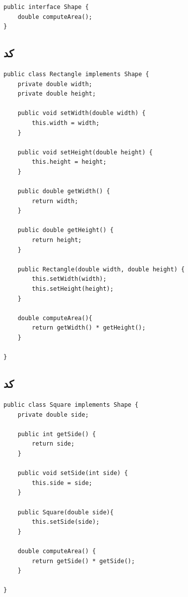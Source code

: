 \begin{Verbatim}[tabsize=4]
public interface Shape {
	double computeArea();
}
\end{Verbatim}

\subsection*{کد }

\begin{Verbatim}[tabsize=4]
public class Rectangle implements Shape {
	private double width;
	private double height;
	
	public void setWidth(double width) {
		this.width = width;
	}
	
	public void setHeight(double height) {
		this.height = height;
	}
	
	public double getWidth() {
		return width;
	}
	
	public double getHeight() {
		return height;
	}
	
	public Rectangle(double width, double height) {
		this.setWidth(width);
		this.setHeight(height);
	}
	
	double computeArea(){
		return getWidth() * getHeight();
	}

}
\end{Verbatim}

\subsection*{کد }

\begin{Verbatim}[tabsize=4]
public class Square implements Shape {
	private double side;
	
	public int getSide() {
		return side;
	}
	
	public void setSide(int side) {
		this.side = side;
	}
	
	public Square(double side){
		this.setSide(side);
	}
	
	double computeArea() {
		return getSide() * getSide();
	}

}
\end{Verbatim}

\newpage
{}

